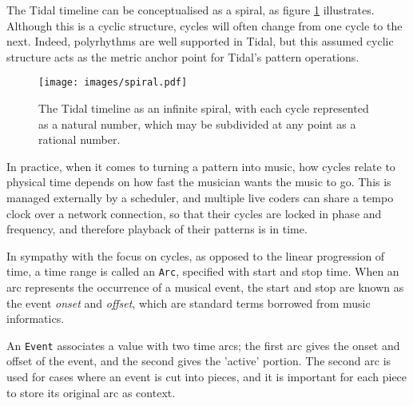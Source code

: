 \documentclass[authoryear,preprint]{sigplanconf}
\begin{document}
The Tidal timeline can be conceptualised as a spiral, as figure
\ref{fig:spiral} illustrates. Although this is a cyclic structure,
cycles will often change from one cycle to the next. Indeed,
polyrhythms are well supported in Tidal, but this assumed cyclic
structure acts as the metric anchor point for Tidal's pattern
operations.


\begin{figure}[t]
    \centering
\texttt{[image: images/spiral.pdf]}
    \caption{The Tidal timeline as an infinite spiral, with each cycle represented as a natural number, which may be subdivided at any point as a rational number.}
    \label{fig:spiral}
\end{figure}

In practice, when it comes to turning a pattern into music, how cycles
relate to physical time depends on how fast the musician wants the
music to go. This is managed externally by a scheduler, and multiple
live coders can share a tempo clock over a network connection, so that
their cycles are locked in phase and frequency, and therefore playback
of their patterns is in time.

In sympathy with the focus on cycles, as opposed to the linear
progression of time, a time range is called an \lstinline{Arc},
specified with start and stop time. When an arc represents the
occurrence of a musical event, the start and stop are known as the
event \emph{onset} and \emph{offset}, which are standard terms
borrowed from music informatics.


An \lstinline{Event} associates a value with two time arcs; the first
arc gives the onset and offset of the event, and the second gives the
'active' portion. The second arc is used for cases where an event is
cut into pieces, and it is important for each piece to store its
original arc as context.

\end{document}
